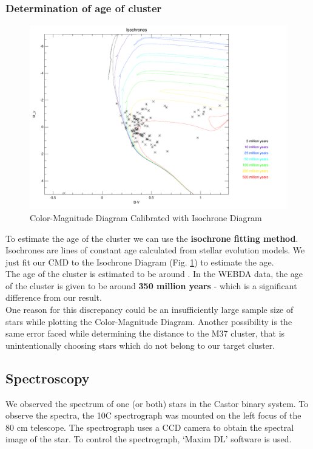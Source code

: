\documentclass[12pt,a4paper]{article}
\begin{document}
\subsubsection*{Determination of age of cluster}
\begin{figure}[H]
  \centering
  \includegraphics[width=1.0\textwidth]{Pictures/ISO_M37_2.pdf}
  \caption{ Color-Magnitude Diagram Calibrated with Isochrone Diagram}
  \label{fig:CMD_ISO}
\end{figure}

To estimate the age of the cluster we can use the \textbf{isochrone fitting method}. Isochrones are lines of constant age calculated from stellar evolution models. We just fit our CMD to the Isochrone Diagram (Fig. \ref{fig:CMD_ISO}) to estimate the age.
\\ The age of the cluster is estimated to be around . In the WEBDA data, the age of the cluster is given to be around \textbf{ 350 million years} - which is a significant difference from our result.
\\ One reason for this discrepancy could be an insufficiently large sample size of stars while plotting the Color-Magnitude Diagram. Another possibility is the same error faced while determining the distance to the M37 cluster, that is unintentionally choosing stars which do not belong to our target cluster.


\subsection{Spectroscopy}

    We observed the spectrum of one (or both) stars in the Castor binary system. To observe the spectra, the 10C spectrograph was mounted on the 
    left focus of the 80 cm telescope. The spectrograph uses a CCD camera to obtain the spectral image of the star. To control the spectrograph, `Maxim DL'
    software is used. 
\end{document}
